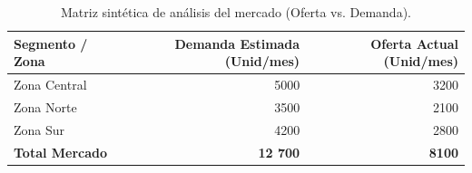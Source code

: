 \begin{table}[htbp]
    \centering
    \caption{Matriz sintética de análisis del mercado (Oferta vs. Demanda).}
    \label{tab:estudio_mercado}
    \begin{tabular}{lrr}
        \toprule
        \textbf{Segmento / Zona} & \textbf{Demanda Estimada (Unid/mes)} & \textbf{Oferta Actual (Unid/mes)} \\
        \midrule
        Zona Central            & 5000 & 3200 \\
        Zona Norte              & 3500 & 2100 \\
        Zona Sur                & 4200 & 2800 \\
        \midrule
        \textbf{Total Mercado}  & \textbf{12 700} & \textbf{8100} \\
        \bottomrule
    \end{tabular}
\end{table}
